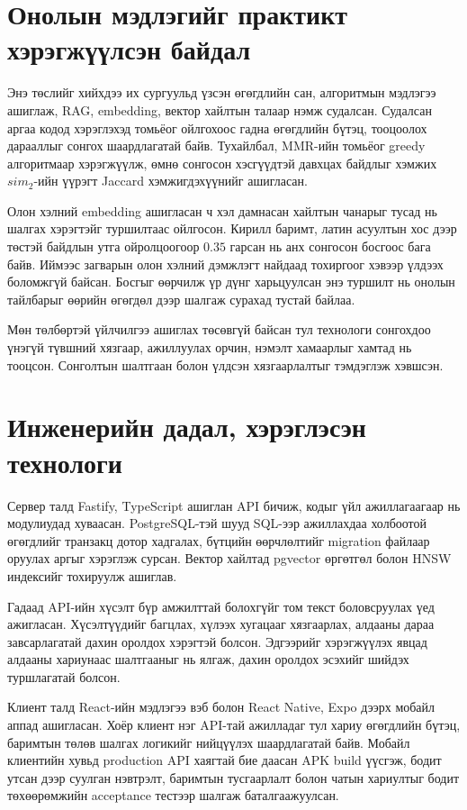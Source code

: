 \documentclass[../main.tex]{subfiles}
\begin{document}
\section{Онолын мэдлэгийг практикт хэрэгжүүлсэн байдал}

Энэ төслийг хийхдээ их сургуульд үзсэн өгөгдлийн сан, алгоритмын мэдлэгээ
ашиглаж, RAG, embedding, вектор хайлтын талаар нэмж судалсан. Судалсан
аргаа кодод хэрэглэхэд томьёог ойлгохоос гадна өгөгдлийн бүтэц, тооцоолох
дарааллыг сонгох шаардлагатай байв. Тухайлбал, MMR-ийн томьёог greedy
алгоритмаар хэрэгжүүлж, өмнө сонгосон хэсгүүдтэй давхцах байдлыг хэмжих
$sim_2$-ийн үүрэгт Jaccard хэмжигдэхүүнийг ашигласан.

Олон хэлний embedding ашигласан ч хэл дамнасан хайлтын чанарыг тусад нь
шалгах хэрэгтэйг туршилтаас ойлгосон. Кирилл баримт, латин асуултын хос дээр
төстэй байдлын утга ойролцоогоор $0.35$ гарсан нь анх сонгосон босгоос бага
байв. Иймээс загварын олон хэлний дэмжлэгт найдаад тохиргоог хэвээр үлдээх
боломжгүй байсан. Босгыг өөрчилж үр дүнг харьцуулсан энэ туршилт нь
онолын тайлбарыг өөрийн өгөгдөл дээр шалгаж сурахад тустай байлаа.

Мөн төлбөртэй үйлчилгээ ашиглах төсөвгүй байсан тул технологи сонгохдоо
үнэгүй түвшний хязгаар, ажиллуулах орчин, нэмэлт хамаарлыг хамтад нь
тооцсон. Сонголтын шалтгаан болон үлдсэн хязгаарлалтыг тэмдэглэж хэвшсэн.

\section{Инженерийн дадал, хэрэглэсэн технологи}

Сервер талд Fastify, TypeScript ашиглан API бичиж, кодыг үйл ажиллагаагаар
нь модулиудад хуваасан. PostgreSQL-тэй шууд SQL-ээр ажиллахдаа холбоотой
өгөгдлийг транзакц дотор хадгалах, бүтцийн өөрчлөлтийг migration файлаар
оруулах аргыг хэрэглэж сурсан. Вектор хайлтад pgvector өргөтгөл болон HNSW
индексийг тохируулж ашиглав.

Гадаад API-ийн хүсэлт бүр амжилттай болохгүйг том текст боловсруулах үед
ажигласан. Хүсэлтүүдийг багцлах, хүлээх хугацааг хязгаарлах, алдааны дараа
завсарлагатай дахин оролдох хэрэгтэй болсон. Эдгээрийг хэрэгжүүлэх явцад
алдааны хариунаас шалтгааныг нь ялгаж, дахин оролдох эсэхийг шийдэх
туршлагатай болсон.

Клиент талд React-ийн мэдлэгээ вэб болон React Native, Expo дээрх мобайл
аппад ашигласан. Хоёр клиент нэг API-тай ажилладаг тул хариу өгөгдлийн бүтэц,
баримтын төлөв шалгах логикийг нийцүүлэх шаардлагатай байв. Мобайл клиентийн хувьд
production API хаягтай бие даасан APK build үүсгэж, бодит утсан дээр суулган
нэвтрэлт, баримтын тусгаарлалт болон чатын хариултыг бодит төхөөрөмжийн acceptance
тестээр шалгаж баталгаажуулсан.
\end{document}
